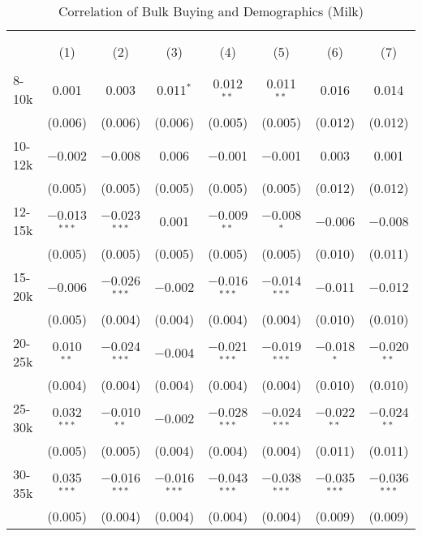 
\begin{table}[!htbp] \centering 
  \caption{Correlation of Bulk Buying and Demographics (Milk)} 
  \label{tab:discountingBehavior3625} 
\begin{tabular}{@{\extracolsep{5pt}}lccccccc} 
\\[-1.8ex]\hline 
\hline \\[-1.8ex] 
\\[-1.8ex] & (1) & (2) & (3) & (4) & (5) & (6) & (7)\\ 
\hline \\[-1.8ex] 
 8-10k & 0.001 & 0.003 & 0.011$^{*}$ & 0.012$^{**}$ & 0.011$^{**}$ & 0.016 & 0.014 \\ 
  & (0.006) & (0.006) & (0.006) & (0.005) & (0.005) & (0.012) & (0.012) \\ 
  10-12k & $-$0.002 & $-$0.008 & 0.006 & $-$0.001 & $-$0.001 & 0.003 & 0.001 \\ 
  & (0.005) & (0.005) & (0.005) & (0.005) & (0.005) & (0.012) & (0.012) \\ 
  12-15k & $-$0.013$^{***}$ & $-$0.023$^{***}$ & 0.001 & $-$0.009$^{**}$ & $-$0.008$^{*}$ & $-$0.006 & $-$0.008 \\ 
  & (0.005) & (0.005) & (0.005) & (0.005) & (0.005) & (0.010) & (0.011) \\ 
  15-20k & $-$0.006 & $-$0.026$^{***}$ & $-$0.002 & $-$0.016$^{***}$ & $-$0.014$^{***}$ & $-$0.011 & $-$0.012 \\ 
  & (0.005) & (0.004) & (0.004) & (0.004) & (0.004) & (0.010) & (0.010) \\ 
  20-25k & 0.010$^{**}$ & $-$0.024$^{***}$ & $-$0.004 & $-$0.021$^{***}$ & $-$0.019$^{***}$ & $-$0.018$^{*}$ & $-$0.020$^{**}$ \\ 
  & (0.004) & (0.004) & (0.004) & (0.004) & (0.004) & (0.010) & (0.010) \\ 
  25-30k & 0.032$^{***}$ & $-$0.010$^{**}$ & $-$0.002 & $-$0.028$^{***}$ & $-$0.024$^{***}$ & $-$0.022$^{**}$ & $-$0.024$^{**}$ \\ 
  & (0.005) & (0.005) & (0.004) & (0.004) & (0.004) & (0.011) & (0.011) \\ 
  30-35k & 0.035$^{***}$ & $-$0.016$^{***}$ & $-$0.016$^{***}$ & $-$0.043$^{***}$ & $-$0.038$^{***}$ & $-$0.035$^{***}$ & $-$0.036$^{***}$ \\ 
  & (0.005) & (0.004) & (0.004) & (0.004) & (0.004) & (0.009) & (0.009) \\ 

\end{tabular}
\end{table}
